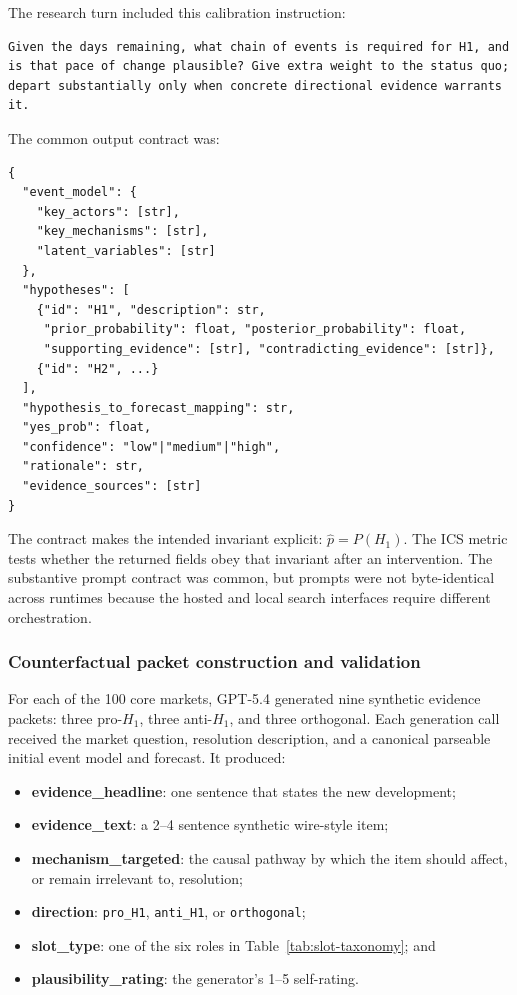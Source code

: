 The research turn included this calibration instruction:

\begin{small}
\begin{verbatim}
Given the days remaining, what chain of events is required for H1, and
is that pace of change plausible? Give extra weight to the status quo;
depart substantially only when concrete directional evidence warrants it.
\end{verbatim}
\end{small}

The common output contract was:

\begin{small}
\begin{verbatim}
{
  "event_model": {
    "key_actors": [str],
    "key_mechanisms": [str],
    "latent_variables": [str]
  },
  "hypotheses": [
    {"id": "H1", "description": str,
     "prior_probability": float, "posterior_probability": float,
     "supporting_evidence": [str], "contradicting_evidence": [str]},
    {"id": "H2", ...}
  ],
  "hypothesis_to_forecast_mapping": str,
  "yes_prob": float,
  "confidence": "low"|"medium"|"high",
  "rationale": str,
  "evidence_sources": [str]
}
\end{verbatim}
\end{small}

The contract makes the intended invariant explicit: \(\hat p=P(H_1)\).  The ICS
metric tests whether the returned fields obey that invariant after an intervention.
The substantive prompt contract was common, but prompts were not byte-identical across
runtimes because the hosted and local search interfaces require different orchestration.

\subsubsection{Counterfactual packet construction and validation}
\label{app:cf-taxonomy}

For each of the 100 core markets, GPT-5.4 generated nine synthetic evidence packets:
three pro-$H_1$, three anti-$H_1$, and three orthogonal.  Each generation call received
the market question, resolution description, and a canonical parseable initial event
model and forecast.  It produced:

\begin{itemize}
  \item \textbf{evidence\_headline}: one sentence that states the new development;
  \item \textbf{evidence\_text}: a 2--4 sentence synthetic wire-style item;
  \item \textbf{mechanism\_targeted}: the causal pathway by which the item should
        affect, or remain irrelevant to, resolution;
  \item \textbf{direction}: \texttt{pro\_H1}, \texttt{anti\_H1}, or
        \texttt{orthogonal};
  \item \textbf{slot\_type}: one of the six roles in
        Table~\ref{tab:slot-taxonomy}; and
  \item \textbf{plausibility\_rating}: the generator's 1--5 self-rating.
\end{itemize}

